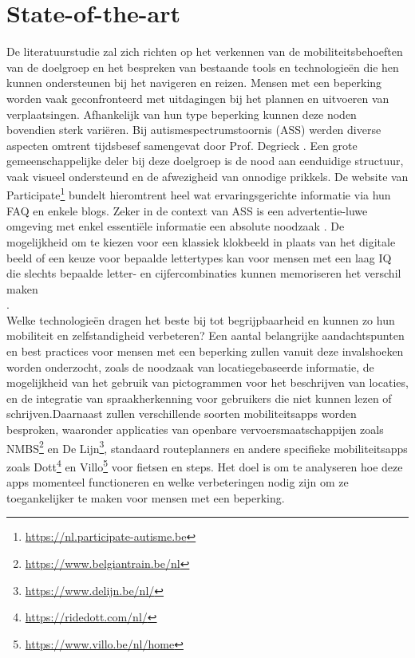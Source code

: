 
\section{State-of-the-art}%
\label{sec:state-of-the-art}
  
  De literatuurstudie zal zich richten op het verkennen van de mobiliteitsbehoeften van de doelgroep en het bespreken van bestaande tools en technologieën die hen kunnen ondersteunen bij het navigeren en reizen.
  Mensen met een beperking worden vaak geconfronteerd met uitdagingen bij het plannen en uitvoeren van verplaatsingen. Afhankelijk van hun type beperking kunnen deze noden bovendien sterk variëren. Bij autismespectrumstoornis (ASS) werden diverse aspecten omtrent tijdsbesef samengevat door Prof. Degrieck \autocite{Degrieck2014}.
  Een grote gemeenschappelijke deler bij deze doelgroep is de nood aan eenduidige structuur, vaak visueel ondersteund en de afwezigheid van onnodige prikkels. De website van Participate\footnote{\url{https://nl.participate-autisme.be}} bundelt hieromtrent heel wat ervaringsgerichte informatie via hun FAQ en enkele blogs. Zeker in de context van ASS is een advertentie-luwe omgeving met enkel essentiële informatie een absolute noodzaak \autocite{Roeyers2014}. 
  De mogelijkheid om te kiezen voor een klassiek klokbeeld in plaats van het digitale beeld of een keuze voor bepaalde lettertypes kan voor mensen met een laag IQ die slechts bepaalde letter- en cijfercombinaties kunnen memoriseren het verschil maken\\ \autocite{Uyttersprot2021,Tytgat2014,DeGraaf2001}. \\Welke technologieën dragen het beste bij tot begrijpbaarheid en kunnen zo hun mobiliteit en zelfstandigheid verbeteren?
  Een aantal belangrijke aandachtspunten en best practices voor mensen met een beperking zullen vanuit deze invalshoeken worden onderzocht, zoals de noodzaak van locatiegebaseerde informatie, de mogelijkheid van het gebruik van pictogrammen voor het beschrijven van locaties, en de integratie van spraakherkenning voor gebruikers die niet kunnen lezen of schrijven.Daarnaast zullen verschillende soorten mobiliteitsapps worden besproken, waaronder applicaties van openbare vervoersmaatschappijen zoals NMBS\footnote{\url{https://www.belgiantrain.be/nl}} en De Lijn\footnote{\url{https://www.delijn.be/nl/}}, standaard routeplanners en andere specifieke mobiliteitsapps zoals Dott\footnote{\url{https://ridedott.com/nl/}} en Villo\footnote{\url{https://www.villo.be/nl/home}} voor fietsen en steps. Het doel is om te analyseren hoe deze apps momenteel functioneren en welke verbeteringen nodig zijn om ze toegankelijker te maken voor mensen met een beperking.
